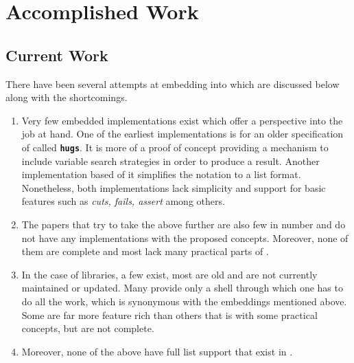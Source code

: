 \documentclass[thesis-solanki.tex]{subfiles}
\begin{document}
\chapter{Accomplished Work}\label{chap:proposedWork}
\section{Current Work}

There have been several attempts at embedding  into  which are discussed below along with the 
shortcomings.

\begin{enumerate}
\item Very few embedded implementations exist which offer a perspective into the job at hand. One of the earliest implementations 
\cite{website:mini-prolog-hugs98} is for an older specification of  called  
\texttt{\bfseries{hugs}}. It is more of a proof of concept providing a mechanism to include variable search strategies in order to produce 
a result. Another implementation \cite{website:takashi-workplace} based of it simplifies the notation to a list format. Nonetheless, both 
implementations lack simplicity and support for basic  features such as \textit{cuts, fails, assert} among others.   

\begin{comment}
\item Only two embeddings exist, one of them is old and made for \texttt{\bfseries{hugs}} a functional programming system based on the 
\progLang{Haskell 98} specification. It is complex and also lacks a lot of \progLang{Prolog} like features including \textit{cuts, fails, 
assert} among others. The second one is based off the first one to make it simple but it loses the variable search strategy support which 
allows the programmer to choose the manner in which a solution is produced. 
\end{comment}

\item The papers that try to take the above further are also few in number and do not have any implementations with the proposed 
concepts. Moreover, none of them are complete and most lack many practical parts of .

\item In the case of libraries, a few exist, most are old and are not currently maintained or updated. Many provide only a shell through which one has to do all the work, 
which is synonymous with the embeddings mentioned above. Some are far more feature rich than others that is with some practical  
concepts, but are not complete.

\item Moreover, none of the above have full list support that exist in .
\end{enumerate}
\end{document}
